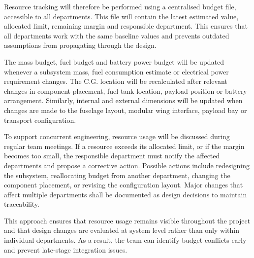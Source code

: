 Resource tracking will therefore be performed using a centralised budget file, accessible to all departments. This file will contain the latest estimated value, allocated limit, remaining margin and responsible department. This ensures that all departments work with the same baseline values and prevents outdated assumptions from propagating through the design.

The mass budget, fuel budget and battery power budget will be updated whenever a subsystem mass, fuel consumption estimate or electrical power requirement changes. The C.G. location will be recalculated after relevant changes in component placement, fuel tank location, payload position or battery arrangement. Similarly, internal and external dimensions will be updated when changes are made to the fuselage layout, modular wing interface, payload bay or transport configuration.

To support concurrent engineering, resource usage will be discussed during regular team meetings. If a resource exceeds its allocated limit, or if the margin becomes too small, the responsible department must notify the affected departments and propose a corrective action. Possible actions include redesigning the subsystem, reallocating budget from another department, changing the component placement, or revising the configuration layout. Major changes that affect multiple departments shall be documented as design decisions to maintain traceability.

This approach ensures that resource usage remains visible throughout the project and that design changes are evaluated at system level rather than only within individual departments. As a result, the team can identify budget conflicts early and prevent late-stage integration issues.





